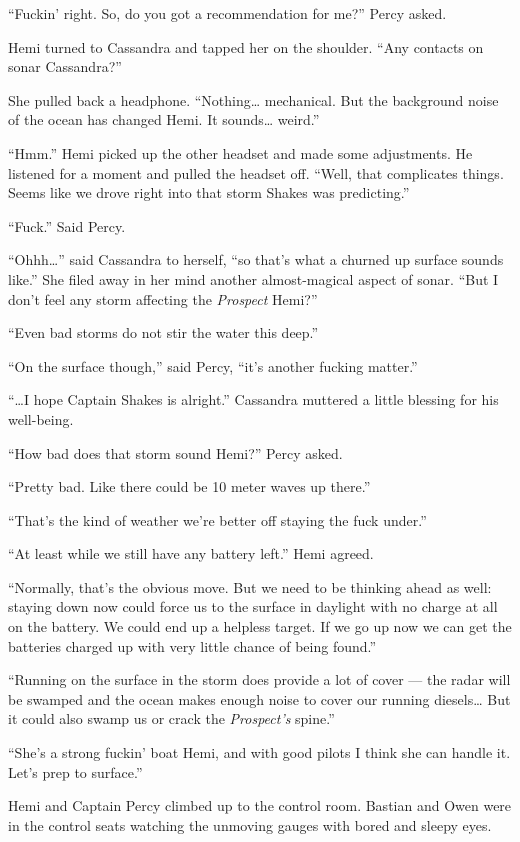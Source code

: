 \documentclass[
]{scrbook}
\begin{document}
``Fuckin' right. So, do you got a recommendation for me?'' Percy asked.

Hemi turned to Cassandra and tapped her on the shoulder. ``Any contacts
on sonar Cassandra?''

She pulled back a headphone. ``Nothing\ldots{} mechanical. But the
background noise of the ocean has changed Hemi. It sounds\ldots{}
weird.''

``Hmm.'' Hemi picked up the other headset and made some adjustments. He
listened for a moment and pulled the headset off. ``Well, that
complicates things. Seems like we drove right into that storm Shakes was
predicting.''

``Fuck.'' Said Percy.

``Ohhh\ldots{}'' said Cassandra to herself, ``so that's what a churned
up surface sounds like.'' She filed away in her mind another
almost-magical aspect of sonar. ``But I don't feel any storm affecting
the \emph{Prospect} Hemi?''

``Even bad storms do not stir the water this deep.''

``On the surface though,'' said Percy, ``it's another fucking matter.''

``\ldots I hope Captain Shakes is alright.'' Cassandra muttered a little
blessing for his well-being.

``How bad does that storm sound Hemi?'' Percy asked.

``Pretty bad. Like there could be 10 meter waves up there.''

``That's the kind of weather we're better off staying the fuck under.''

``At least while we still have any battery left.'' Hemi agreed.

``Normally, that's the obvious move. But we need to be thinking ahead as
well: staying down now could force us to the surface in daylight with no
charge at all on the battery. We could end up a helpless target. If we
go up now we can get the batteries charged up with very little chance of
being found.''

``Running on the surface in the storm does provide a lot of cover ---
the radar will be swamped and the ocean makes enough noise to cover our
running diesels\ldots{} But it could also swamp us or crack the
\emph{Prospect's} spine.''

``She's a strong fuckin' boat Hemi, and with good pilots I think she can
handle it. Let's prep to surface.''

Hemi and Captain Percy climbed up to the control room. Bastian and Owen
were in the control seats watching the unmoving gauges with bored and
sleepy eyes.
\end{document}
